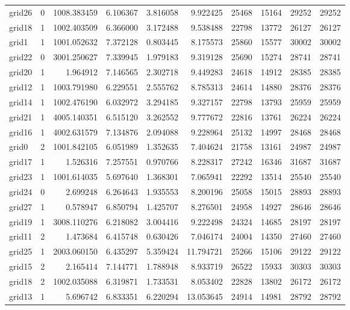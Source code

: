 \begin{longtable}{|l|r|r|r|r|r|r|r|r|r|}
grid26 & 0 & 1008.383459 & 6.106367 & 3.816058 & 9.922425 & 25468 & 15164 & 29252 & 29252 \\
grid18 & 1 & 1002.403509 & 6.366000 & 3.172488 & 9.538488 & 22798 & 13772 & 26127 & 26127 \\
grid1 & 1 & 1001.052632 & 7.372128 & 0.803445 & 8.175573 & 25860 & 15577 & 30002 & 30002 \\
grid22 & 0 & 3001.250627 & 7.339945 & 1.979183 & 9.319128 & 25690 & 15274 & 28741 & 28741 \\
grid20 & 1 & 1.964912 & 7.146565 & 2.302718 & 9.449283 & 24618 & 14912 & 28385 & 28385 \\
grid12 & 1 & 1003.791980 & 6.229551 & 2.555762 & 8.785313 & 24614 & 14880 & 28376 & 28376 \\
grid14 & 1 & 1002.476190 & 6.032972 & 3.294185 & 9.327157 & 22798 & 13793 & 25959 & 25959 \\
grid21 & 1 & 4005.140351 & 6.515120 & 3.262552 & 9.777672 & 22816 & 13761 & 26224 & 26224 \\
grid16 & 1 & 4002.631579 & 7.134876 & 2.094088 & 9.228964 & 25132 & 14997 & 28468 & 28468 \\
grid0 & 2 & 1001.842105 & 6.051989 & 1.352635 & 7.404624 & 21758 & 13161 & 24987 & 24987 \\
grid17 & 1 & 1.526316 & 7.257551 & 0.970766 & 8.228317 & 27242 & 16346 & 31687 & 31687 \\
grid23 & 1 & 1001.614035 & 5.697640 & 1.368301 & 7.065941 & 22292 & 13514 & 25540 & 25540 \\
grid24 & 0 & 2.699248 & 6.264643 & 1.935553 & 8.200196 & 25058 & 15015 & 28893 & 28893 \\
grid27 & 1 & 0.578947 & 6.850794 & 1.425707 & 8.276501 & 24958 & 14927 & 28646 & 28646 \\
grid19 & 1 & 3008.110276 & 6.218082 & 3.004416 & 9.222498 & 24324 & 14685 & 28197 & 28197 \\
grid11 & 2 & 1.473684 & 6.415748 & 0.630426 & 7.046174 & 24004 & 14350 & 27460 & 27460 \\
grid25 & 1 & 2003.060150 & 6.435297 & 5.359424 & 11.794721 & 25266 & 15106 & 29122 & 29122 \\
grid15 & 2 & 2.165414 & 7.144771 & 1.788948 & 8.933719 & 26522 & 15933 & 30303 & 30303 \\
grid18 & 2 & 1002.035088 & 6.319871 & 1.733531 & 8.053402 & 22828 & 13802 & 26172 & 26172 \\
grid13 & 1 & 5.696742 & 6.833351 & 6.220294 & 13.053645 & 24914 & 14981 & 28792 & 28792 \\

\end{longtable}
